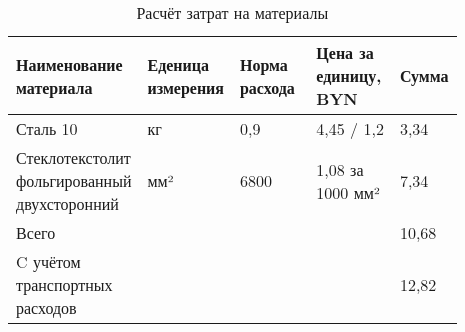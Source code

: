 \begin{table}[H]
  \small
  \caption{Расчёт затрат на материалы}
  \begin{tabular}{|p{0.2\linewidth} | p{0.2\linewidth}| p{0.2\linewidth} |p{0.2\linewidth}| p{0.09\linewidth} |}
    \hline
Наименование материала & Еденица измерения & Норма расхода & Цена за единицу, BYN & Сумма\\[0pt]
\hline
    Сталь 10 & кг & 0,9 & 4,45 / 1,2 & 3,34\\[0pt]
    \hline
    Стеклотекстолит фольгированный двухсторонний & мм² & 6800 & 1,08 за 1000  мм² & 7,34\\[0pt]
    \hline
    Всего &  &  &  & 10,68 \\[0pt]
    \hline
    C учётом транспортных расходов &  &  &  & 12,82 \\[0pt]
    \hline
\end{tabular}
\end{table}

